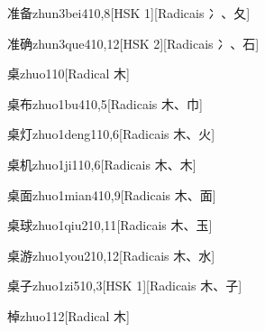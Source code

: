 \begin{entry}{准备}{zhun3bei4}{10,8}[HSK 1][Radicais ⼎、⼡]
\end{entry}

\begin{entry}{准确}{zhun3que4}{10,12}[HSK 2][Radicais ⼎、⽯]
\end{entry}

\begin{entry}{桌}{zhuo1}{10}[Radical ⽊]
\end{entry}

\begin{entry}{桌布}{zhuo1bu4}{10,5}[Radicais ⽊、⼱]
\end{entry}

\begin{entry}{桌灯}{zhuo1deng1}{10,6}[Radicais ⽊、⽕]
\end{entry}

\begin{entry}{桌机}{zhuo1ji1}{10,6}[Radicais ⽊、⽊]
\end{entry}

\begin{entry}{桌面}{zhuo1mian4}{10,9}[Radicais ⽊、⾯]
\end{entry}

\begin{entry}{桌球}{zhuo1qiu2}{10,11}[Radicais ⽊、⽟]
\end{entry}

\begin{entry}{桌游}{zhuo1you2}{10,12}[Radicais ⽊、⽔]
\end{entry}

\begin{entry}{桌子}{zhuo1zi5}{10,3}[HSK 1][Radicais ⽊、⼦]
\end{entry}

\begin{entry}{棹}{zhuo1}{12}[Radical ⽊]
\end{entry}

